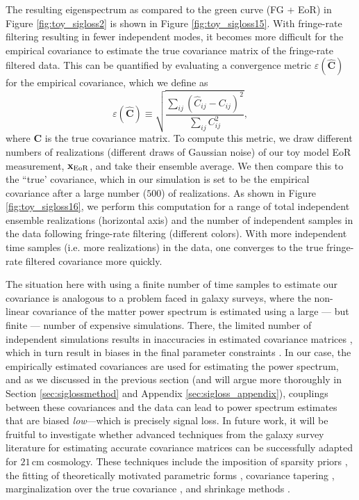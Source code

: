 \documentclass[preprint2,numberedappendix,tighten]{aastex6}
\newcommand{\C}{\mathbf{C}}
\newcommand{\Chat}{\mathbf{\widehat{C}}}
\begin{document}
The resulting eigenspectrum as compared to the green curve (FG + EoR) in Figure \ref{fig:toy_sigloss2} is shown in Figure 
\ref{fig:toy_sigloss15}. With 
fringe-rate filtering resulting in fewer independent modes, it becomes more difficult for the empirical covariance to estimate the 
true covariance matrix of the fringe-rate filtered data. This can be quantified by evaluating a convergence metric $\varepsilon(\Chat)$ for the empirical covariance, which we define as
\begin{equation}
\label{eq:converge}
\varepsilon (\Chat) \equiv \sqrt{\frac{\sum_{ij} (\widehat{C}_{ij} - {C}_{ij})^2}{\sum_{ij} {C}_{ij}^2}},
\end{equation}
where $\C$ is the true covariance matrix. To compute this metric, we draw different numbers of realizations (different draws of Gaussian noise) of our toy model EoR measurement, $\textbf{x}_{\rm EoR}$, and take their ensemble average. We then compare this to the ``true' covariance, which in our simulation is set to be the empirical covariance after a large number ($500$) of realizations. As shown in Figure \ref{fig:toy_sigloss16}, we perform this computation for a range of total independent ensemble realizations (horizontal axis) and the number of independent samples in the data following fringe-rate filtering (different colors). With more independent time samples (i.e. more realizations) in the data, one converges to the true fringe-rate filtered covariance more quickly. 

The situation here with using a finite number of time samples to estimate our covariance is analogous to a problem faced in galaxy surveys, where the non-linear covariance 
of the matter power spectrum is estimated using a large --- but finite --- number of expensive simulations. There, the limited 
number of independent simulations results in inaccuracies in estimated covariance matrices 
\citep{dodelson_schneider2013,taylor_joachimi_etal2014}, which in turn result in biases in the final parameter constraints 
\citep{hartlap_et_al2007}. In our case, the empirically estimated covariances are used for estimating the power spectrum, and 
as we discussed in the previous section (and will argue more thoroughly in Section \ref{sec:siglossmethod} and Appendix \ref{sec:sigloss_appendix}), couplings between these covariances and the data can lead to power spectrum estimates that are biased 
\emph{low}---which is precisely signal loss. In future work, it will be fruitful to investigate whether advanced techniques from the 
galaxy survey literature for estimating accurate covariance matrices can be successfully adapted for $21\,\textrm{cm}$ 
cosmology. These techniques include the imposition of sparsity priors \citep{padmanabhan_et_al2016}, the fitting of 
theoretically motivated parametric forms \citep{pearson_samushia2016}, covariance tapering \citep{paz_sanchez2015}, 
marginalization over the true covariance \citep{sellentin_heavens2016}, and shrinkage methods 
\citep{pope_szapudi2008,joachimi_2017}.
\end{document}
